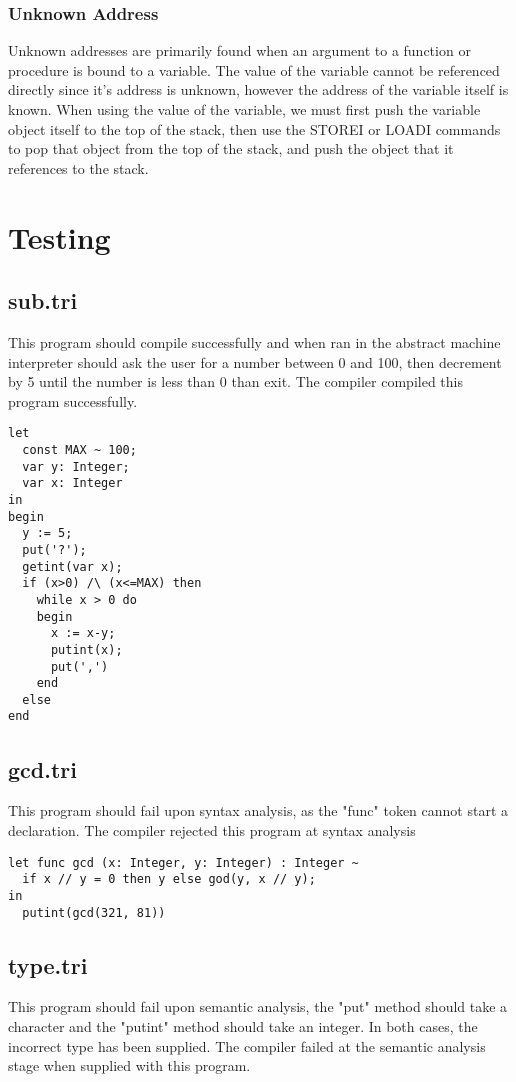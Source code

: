 \documentclass{article}
\begin{document}
\subsubsection{Unknown Address}
Unknown addresses are primarily found when an argument to a function or procedure is bound to a variable. The value of the variable cannot be referenced directly since it's address is unknown, however the address of the variable itself is known. When using the value of the variable, we must first push the variable object itself to the top of the stack, then use the STOREI or LOADI commands to pop that object from the top of the stack, and push the object that it references to the stack.

\section{Testing}
\subsection{sub.tri}
This program should compile successfully and when ran in the abstract machine interpreter should ask the user for a number between 0 and 100, then decrement by 5 until the number is less than 0 than exit. The compiler compiled this program successfully.

\begin{lstlisting}
let
  const MAX ~ 100;
  var y: Integer;
  var x: Integer
in
begin
  y := 5;
  put('?');
  getint(var x);
  if (x>0) /\ (x<=MAX) then
    while x > 0 do 
    begin
      x := x-y;
      putint(x);
      put(',')
    end
  else
end
\end{lstlisting}

\subsection{gcd.tri}
This program should fail upon syntax analysis, as the "func" token cannot start a declaration. The compiler rejected this program at syntax analysis

\begin{lstlisting}
let func gcd (x: Integer, y: Integer) : Integer ~
  if x // y = 0 then y else god(y, x // y);
in
  putint(gcd(321, 81))
\end{lstlisting}

\subsection{type.tri}
This program should fail upon semantic analysis, the "put" method should take a character and the "putint" method should take an integer. In both cases, the incorrect type has been supplied. The compiler failed at the semantic analysis stage when supplied with this program.
\end{document}
